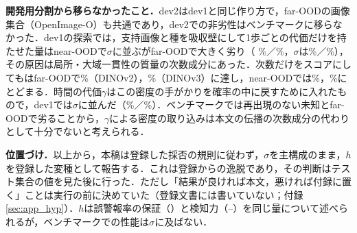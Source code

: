 \textbf{開発用分割から移らなかったこと．}dev2はdev1と同じ作り方で，far-OODの画像集合（OpenImage-O）も共通であり，dev2での非劣性はベンチマークに移らなかった．dev1の探索では，支持画像と種を吸収壁にして1歩ごとの代価だけを持たせた量はnear-OODで$\sigma$に並ぶがfar-OODで大きく劣り（\FPR{} \NHsExplAbsOneNear\%／\NHsExplAbsOneFar\%，$\sigma$は\NHsExplSigNear\%／\NHsExplSigFar\%），その原因は局所・大域一貫性の質量の次数成分にあった．次数だけをスコアにしても\AUC{}はfar-OODで\NHsExplDegAucFarVTwo\%（DINOv2），\NHsExplDegAucFarVThree\%（DINOv3）に達し，near-OODでは\NHsExplDegAucNearVTwo\%，\NHsExplDegAucNearVThree\%にとどまる．時間の代価$\gamma$はこの密度の手がかりを確率の中に戻すために入れたもので，dev1では$\sigma$に並んだ（\NHsExplFinNear\%／\NHsExplFinFar\%）．ベンチマークでは再出現のない未知とfar-OODで劣ることから，$\gamma$による密度の取り込みは本文の伝播の次数成分の代わりとして十分でないと考えられる．

\textbf{位置づけ．}以上から，本稿は登録した採否の規則に従わず，$\sigma$を主構成のまま，$h$を登録した変種として報告する．これは登録からの逸脱であり，その判断はテスト集合の値を見た後に行った．ただし「結果が良ければ本文，悪ければ付録に置く」ことは実行の前に決めていた（登録文書には書いていない；付録\ref{sec:app_hyp}）．$h$は誤警報率の保証（\TValid）と検知力（\TEscape{}--\CSep）を同じ量について述べられるが，ベンチマークでの性能は$\sigma$に及ばない．
